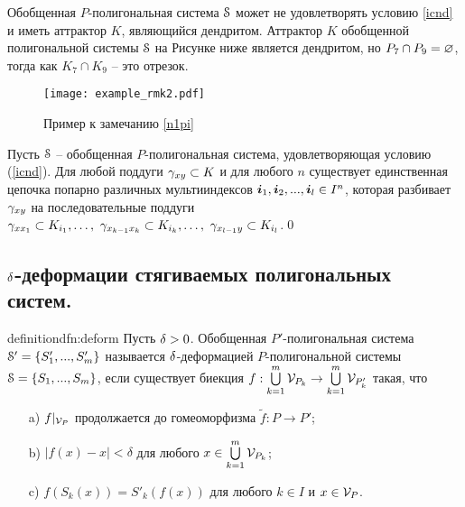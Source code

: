 \begin{remark}\label{n1pi}  
Обобщенная $P$-полигональная система ${\EuScript S}$ может не удовлетворять условию \ref{icnd} и иметь аттрактор $K$, являющийся дендритом. 
Аттрактор $K$ обобщенной полигональной системы ${\EuScript S}$ на Рисунке ниже является дендритом, но  $P_7\cap P_9=\varnothing$, тогда как $K_7\cap K_9$ -- это отрезок.
\end{remark}

\begin{figure}[H]
    \centering
    \texttt{[image: example\_rmk2.pdf]}
    \caption{Пример к замечанию \ref{n1pi}}
\label{img:rmk1}
\end{figure}

\begin{corollary}
Пусть ${\EuScript S}$ -- обобщенная $P$-полигональная система, удовлетворяющая условию (\ref{icnd}). Для любой поддуги $\gamma_{xy}\subset K$ и для любого $n$ существует единственная цепочка попарно различных мультииндексов ${\bm{i}}_1,{\bm{i}}_2,...,{\bm{i}}_l\in I^n$, которая разбивает $\gamma_{xy}$ на последовательные поддуги $\gamma_{xx_1}\subset K_{i_1},\ldots,\ \gamma_{x_{k-1}x_k}\subset K_{i_k},\ldots,\ \gamma_{x_{l-1}y}\subset K_{i_l}$.\qed
\end{corollary}


\subsection{ $\delta$-деформации стягиваемых полигональных систем.}
\begin{restatethis}{definition}{dfn:deform}\label{dfn:deform} 
Пусть $\delta>0$. Обобщенная $P'$-полигональная система ${\EuScript S}'=\{S'_1,...,S'_m\}$ называется $\delta$-деформацией $P$-полигональной системы ${\EuScript S}=\{S_1,...,S_m\}$, если существует биекция $f:\bigcup\limits_{k=1}^m {\mathcal V}_{P_k}\to \bigcup\limits_{k=1}^m {\mathcal V}_{P'_k}$ такая, что
\begin{itemize}[nolistsep]
    \item[a)] $f|_{{\mathcal V}_P}$ продолжается до гомеоморфизма $\tilde f: P\to  P'$;
    \item[b)] $|f(x)-x|<\delta$  для любого $x\in \bigcup\limits_{k=1}^m {\mathcal V}_{P_k}$;
    \item[c)] $f(S_k(x))=S'_k(f(x))$ для любого $k\in I$ и $x\in {\mathcal V}_P$.
\end{itemize}    
\end{restatethis}


